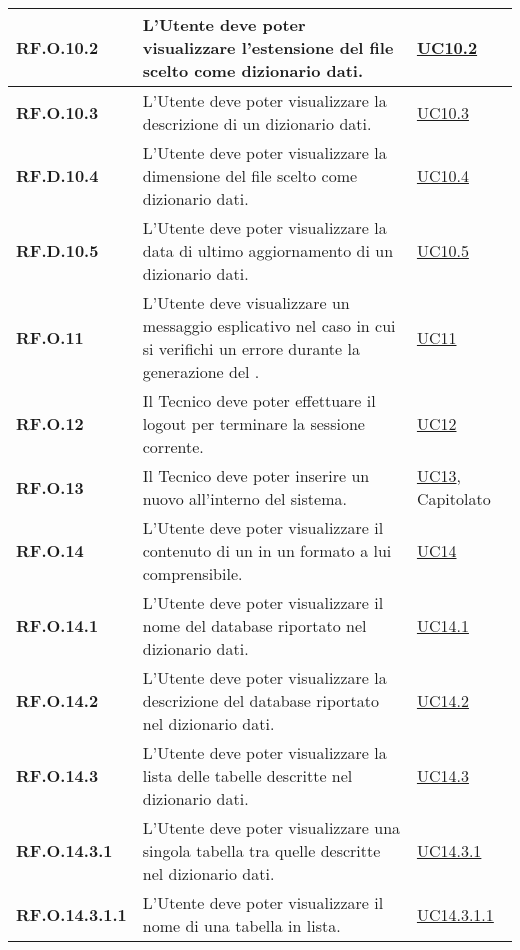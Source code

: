 \begin{adjustwidth}{-0.5cm}{-0.5cm}
\begin{longtable}{|P{3cm}|P{6,5cm}|>{\arraybackslash}P{4cm}|}
    \hline
    \textbf{RF.O.10.2} & L'Utente deve poter visualizzare l'estensione del file scelto come dizionario dati. & \hyperref[UC10point2]{UC10.2}\\
    \hline
    \textbf{RF.O.10.3} & L'Utente deve poter visualizzare la descrizione di un dizionario dati. & \hyperref[UC10point3]{UC10.3}\\
    \hline
    \textbf{RF.D.10.4} & L'Utente deve poter visualizzare la dimensione del file scelto come dizionario dati. & \hyperref[UC10point4]{UC10.4}\\
    \hline
    \textbf{RF.D.10.5} & L'Utente deve poter visualizzare la data di ultimo aggiornamento di un dizionario dati. & \hyperref[UC10point5]{UC10.5}\\
    \hline
    \textbf{RF.O.11} & L'Utente deve visualizzare un messaggio esplicativo nel caso in cui si verifichi un errore durante la generazione del . & \hyperref[UC11]{UC11}\\
    \hline
    \textbf{RF.O.12} & Il Tecnico deve poter effettuare il logout per terminare la sessione corrente. & \hyperref[UC12]{UC12}\\
    \hline
    \textbf{RF.O.13} & Il Tecnico deve poter inserire un nuovo  all'interno del sistema. & \hyperref[UC13]{UC13}, Capitolato\\
    \hline
    \textbf{RF.O.14} & L'Utente deve poter visualizzare il contenuto di un  in un formato a lui comprensibile. & \hyperref[UC14]{UC14}\\
    \hline
    \textbf{RF.O.14.1} & L'Utente deve poter visualizzare il nome del database riportato nel dizionario dati. & \hyperref[UC14point1]{UC14.1}\\
    \hline
    \textbf{RF.O.14.2} & L'Utente deve poter visualizzare la descrizione del database riportato nel dizionario dati. & \hyperref[UC14point2]{UC14.2}\\
    \hline
    \textbf{RF.O.14.3} & L'Utente deve poter visualizzare la lista delle tabelle descritte nel dizionario dati. & \hyperref[UC14point3]{UC14.3}\\
    \hline
    \textbf{RF.O.14.3.1} & L'Utente deve poter visualizzare una singola tabella tra quelle descritte nel dizionario dati. & \hyperref[UC14point3point1]{UC14.3.1}\\
    \hline
    \textbf{RF.O.14.3.1.1} & L'Utente deve poter visualizzare il nome di una tabella in lista. & \hyperref[UC14point3point1point1]{UC14.3.1.1}\\

\end{longtable}
\end{adjustwidth}
